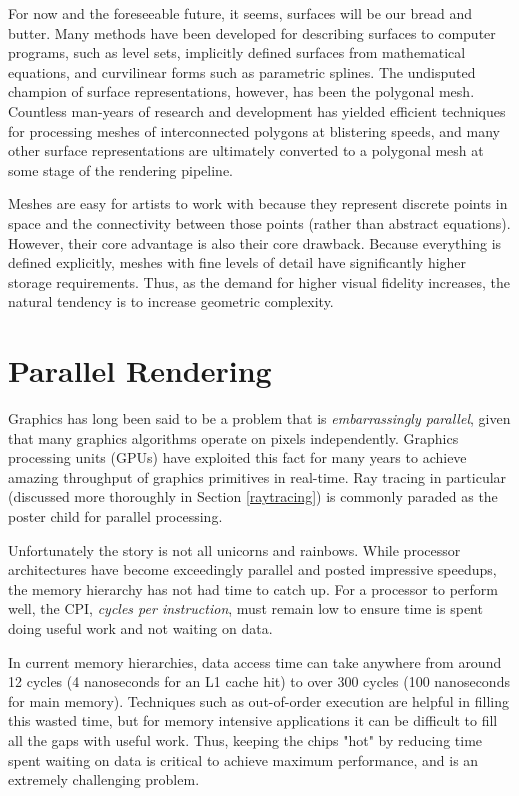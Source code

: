 \documentclass[12pt]{ucthesis}
\begin{document}
For now and the foreseeable future, it seems, surfaces will be our bread and
butter. Many methods have been developed for describing surfaces to computer
programs, such as level sets, implicitly defined surfaces from mathematical
equations, and curvilinear forms such as parametric splines. The undisputed
champion of surface representations, however, has been the polygonal mesh.
Countless man-years of research and development has yielded efficient
techniques for processing meshes of interconnected polygons at blistering
speeds, and many other surface representations are ultimately converted to a
polygonal mesh at some stage of the rendering pipeline.

Meshes are easy for artists to work with because they represent discrete
points in space and the connectivity between those points (rather than abstract
equations). However, their core advantage is also their core drawback. Because
everything is defined explicitly, meshes with fine levels of detail have
significantly higher storage requirements. Thus, as the demand for higher
visual fidelity increases, the natural tendency is to increase geometric
complexity.

\section{Parallel Rendering}
\label{parallel}

Graphics has long been said to be a problem that is \emph{embarrassingly parallel},
given that many graphics algorithms operate on pixels independently. Graphics
processing units (GPUs) have exploited this fact for many years to achieve
amazing throughput of graphics primitives in real-time. Ray tracing in
particular (discussed more thoroughly in Section \ref{raytracing}) is commonly
paraded as the poster child for parallel processing.

Unfortunately the story is not all unicorns and rainbows. While processor
architectures have become exceedingly parallel and posted impressive
speedups, the memory hierarchy has not had time to catch up. For a processor
to perform well, the CPI, \emph{cycles per instruction}, must remain low to
ensure time is spent doing useful work and not waiting on data.

In current memory hierarchies, data access time can take anywhere from around
12 cycles (4 nanoseconds for an L1 cache hit) to over 300 cycles (100
nanoseconds for main memory). Techniques such as out-of-order execution are
helpful in filling this wasted time, but for memory intensive applications it
can be difficult to fill all the gaps with useful work. Thus, keeping the chips
"hot" by reducing time spent waiting on data is critical to achieve maximum
performance, and is an extremely challenging problem.
\end{document}
